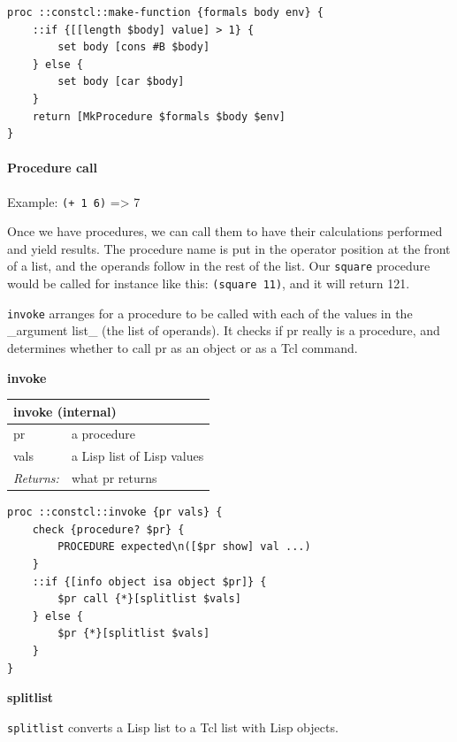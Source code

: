 \documentclass[twoside,9pt]{report}
\begin{document}
\noindent\makebox[\linewidth]{\rule{\linewidth}{0.4pt}}
\begin{lstlisting}
proc ::constcl::make-function {formals body env} {
    ::if {[[length $body] value] > 1} {
        set body [cons #B $body]
    } else {
        set body [car $body]
    }
    return [MkProcedure $formals $body $env]
}
\end{lstlisting}
\noindent\makebox[\linewidth]{\rule{\linewidth}{0.4pt}}
\paragraph{Procedure call}
\label{procedure-call}

Example: \texttt{(+ 1 6)} => 7


Once we have procedures, we can call them to have their calculations performed and yield results. The procedure name is put in the operator position at the front of a list, and the operands follow in the rest of the list. Our \texttt{square} procedure would be called for instance like this: \texttt{(square 11)}, and it will return 121.


\texttt{invoke} arranges for a procedure to be called with each of the values in the \_argument list\_ (the list of operands). It checks if pr really is a procedure, and determines whether to call pr as an object or as a Tcl command.


\textbf{invoke}

\begin{tabular}{ |l l| }
\hline
\multicolumn{2}{|l|}{invoke (internal)} \\
\hline
pr & a procedure \\
vals & a Lisp list of Lisp values \\
\textit{Returns:} & what pr returns \\
\hline
\end{tabular}

\noindent\makebox[\linewidth]{\rule{\linewidth}{0.4pt}}
\begin{lstlisting}
proc ::constcl::invoke {pr vals} {
    check {procedure? $pr} {
        PROCEDURE expected\n([$pr show] val ...)
    }
    ::if {[info object isa object $pr]} {
        $pr call {*}[splitlist $vals]
    } else {
        $pr {*}[splitlist $vals]
    }
}
\end{lstlisting}
\noindent\makebox[\linewidth]{\rule{\linewidth}{0.4pt}}

\textbf{splitlist}


\texttt{splitlist} converts a Lisp list to a Tcl list with Lisp objects.
\end{document}
